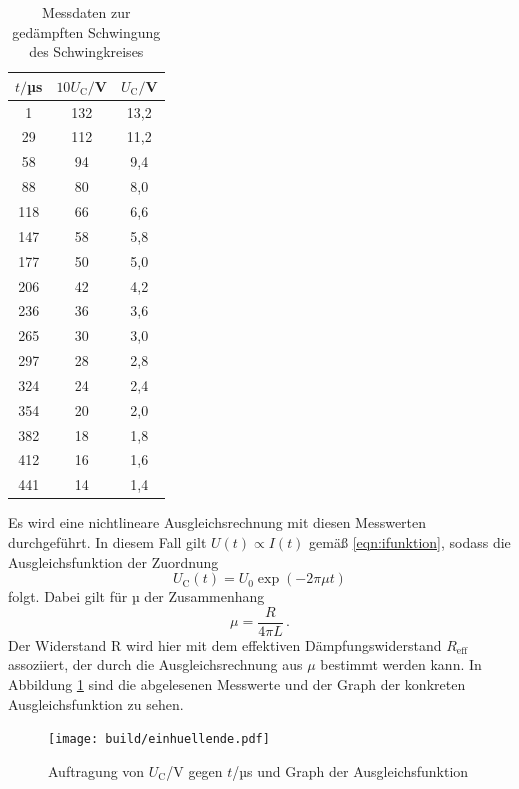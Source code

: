 \begin{table}
\centering
\caption{Messdaten zur gedämpften Schwingung des Schwingkreises}
\label{tab:einhuellende}
\begin{tabular}{c c c}
\toprule
$t/$µs & $10U_\mathrm{C}/$V & $U_\mathrm{C}/$V \\
\midrule
  1 & 132 & 13,2 \\
 29 & 112 & 11,2 \\
 58 &  94 &  9,4 \\
 88 &  80 &  8,0 \\
118 &  66 &  6,6 \\
147 &  58 &  5,8 \\
177 &  50 &  5,0 \\
206 &  42 &  4,2 \\
236 &  36 &  3,6 \\
265 &  30 &  3,0 \\
297 &  28 &  2,8 \\
324 &  24 &  2,4 \\
354 &  20 &  2,0 \\
382 &  18 &  1,8 \\
412 &  16 &  1,6 \\
441 &  14 &  1,4 \\
\bottomrule
\end{tabular}
\end{table}

Es wird eine nichtlineare Ausgleichsrechnung mit diesen Messwerten durchgeführt.
In diesem Fall gilt $U(t) \propto I(t)$ gemäß \eqref{eqn:ifunktion}, sodass die
Ausgleichsfunktion der Zuordnung
\begin{equation}
  U_\text{C}(t) = U_0 \exp(-2 \pi \mu t)
\end{equation}
folgt. Dabei gilt für µ der Zusammenhang
\begin{equation}
  \mu = \frac{R}{4 \pi L}\,.
  \label{eqn:mu}
\end{equation}
Der Widerstand R wird hier mit dem effektiven Dämpfungswiderstand $R_\text{eff}$ assoziiert, der
durch die Ausgleichsrechnung aus $\mu$ bestimmt werden kann.
In Abbildung \ref{fig:einhuellendefit} sind die abgelesenen Messwerte und der Graph
der konkreten Ausgleichsfunktion zu sehen.

\begin{figure}
  \centering
  \texttt{[image: build/einhuellende.pdf]}
  \caption{Auftragung von $U_\text{C}$/V gegen $t$/µs und Graph der Ausgleichsfunktion}
  \label{fig:einhuellendefit}
\end{figure}

